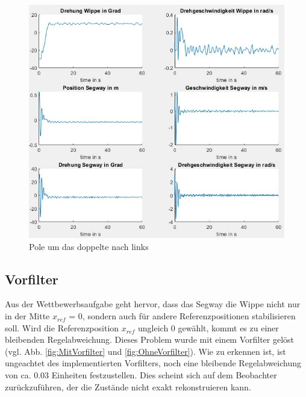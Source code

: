 \documentclass[pdf]{ifacconf}
\begin{document}
\begin{figure}[H]	
\centerline{\includegraphics[width=\linewidth]{Bilder/Regler1mal2.jpg}}
	\caption{Pole um das doppelte nach links}	\label{fig:Rauschen2}
\end{figure}




	\subsection{Vorfilter}
	Aus der Wettbewerbsaufgabe geht hervor, dass das Segway die Wippe nicht nur in der Mitte $x^{}_{ref}$ = 0, sondern auch für andere Referenzpositionen stabilisieren soll. Wird die Referenzposition $x^{}_{ref}$ ungleich 0 gewählt, kommt es zu einer bleibenden Regelabweichung. Dieses Problem wurde mit einem Vorfilter gelöst (vgl. Abb. \ref{fig:MitVorfilter} und \ref{fig:OhneVorfilter}). Wie zu erkennen ist, 
	ist ungeachtet des implementierten Vorfilters, noch eine bleibende Regelabweichung von ca. 0.03 Einheiten festzustellen. Dies scheint sich auf dem Beobachter zurückzuführen, der die Zustände nicht exakt rekonstruieren kann.  
\end{document}
